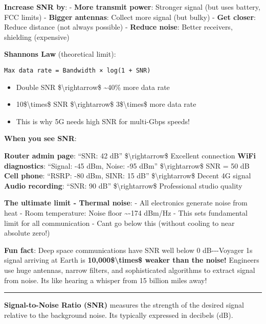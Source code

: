 \textbf{Increase SNR by}: - \textbf{More transmit power}: Stronger
signal (but uses battery, FCC limits) - \textbf{Bigger antennas}:
Collect more signal (but bulky) - \textbf{Get closer}: Reduce distance
(not always possible) - \textbf{Reduce noise}: Better receivers,
shielding (expensive)

\textbf{Shannon\textquotesingle s Law} (theoretical limit):

\begin{verbatim}
Max data rate = Bandwidth × log(1 + SNR)
\end{verbatim}

\begin{itemize}
\tightlist
\item
  Double SNR \$\textbackslash rightarrow\$ \textasciitilde40\% more data
  rate
\item
  10\$\textbackslash times\$ SNR \$\textbackslash rightarrow\$
  3\$\textbackslash times\$ more data rate
\item
  This is why 5G needs high SNR for multi-Gbps speeds!
\end{itemize}

\textbf{When you see SNR}:

\textbf{Router admin page}: ``SNR: 42 dB'' \$\textbackslash rightarrow\$
Excellent connection \textbf{WiFi diagnostics}: ``Signal: -45 dBm,
Noise: -95 dBm'' \$\textbackslash rightarrow\$ SNR = 50 dB \textbf{Cell
phone}: ``RSRP: -80 dBm, SINR: 15 dB'' \$\textbackslash rightarrow\$
Decent 4G signal \textbf{Audio recording}: ``SNR: 90 dB''
\$\textbackslash rightarrow\$ Professional studio quality

\textbf{The ultimate limit - Thermal noise}: - All electronics generate
noise from heat - Room temperature: Noise floor \textasciitilde-174
dBm/Hz - This sets fundamental limit for all communication -
Can\textquotesingle t go below this (without cooling to near absolute
zero!)

\textbf{Fun fact}: Deep space communications have SNR well below 0
dB-\/-\/-Voyager 1\textquotesingle s signal arriving at Earth is
\textbf{10,000\$\textbackslash times\$ weaker than the noise!} Engineers
use huge antennas, narrow filters, and sophisticated algorithms to
extract signal from noise. It\textquotesingle s like hearing a whisper
from 15 billion miles away!

\begin{center}\rule{0.5\linewidth}{0.5pt}\end{center}

\textbf{Signal-to-Noise Ratio (SNR)} measures the strength of the
desired signal relative to the background noise. It\textquotesingle s
typically expressed in decibels (dB).

